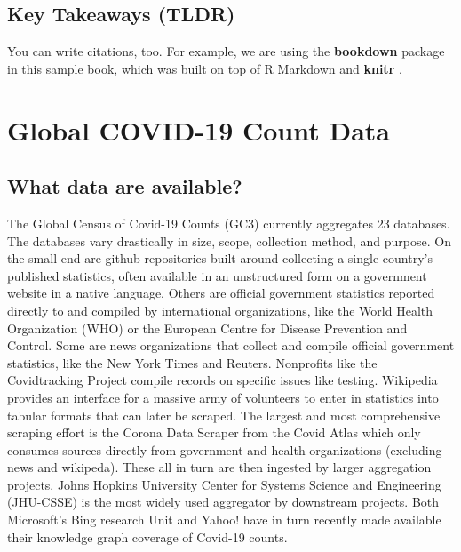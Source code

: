 \documentclass[
]{book}
\begin{document}
\hypertarget{key-takeaways-tldr}{%
\section{Key Takeaways (TLDR)}\label{key-takeaways-tldr}}

You can write citations, too. For example, we are using the \textbf{bookdown} package \citep{R-bookdown} in this sample book, which was built on top of R Markdown and \textbf{knitr} \citep{xie2015}.

\hypertarget{global-covid-19-count-data}{%
\chapter{Global COVID-19 Count Data}\label{global-covid-19-count-data}}

\hypertarget{what-data-are-available}{%
\section{What data are available?}\label{what-data-are-available}}

The Global Census of Covid-19 Counts (GC3) currently aggregates 23 databases. The databases vary drastically in size, scope, collection method, and purpose. On the small end are github repositories built around collecting a single country's published statistics, often available in an unstructured form on a government website in a native language. Others are official government statistics reported directly to and compiled by international organizations, like the World Health Organization (WHO) or the European Centre for Disease Prevention and Control. Some are news organizations that collect and compile official government statistics, like the New York Times and Reuters. Nonprofits like the Covidtracking Project compile records on specific issues like testing. Wikipedia provides an interface for a massive army of volunteers to enter in statistics into tabular formats that can later be scraped. The largest and most comprehensive scraping effort is the Corona Data Scraper from the Covid Atlas which only consumes sources directly from government and health organizations (excluding news and wikipeda). These all in turn are then ingested by larger aggregation projects. Johns Hopkins University Center for Systems Science and Engineering (JHU-CSSE) is the most widely used aggregator by downstream projects. Both Microsoft's Bing research Unit and Yahoo! have in turn recently made available their knowledge graph coverage of Covid-19 counts.
\end{document}

